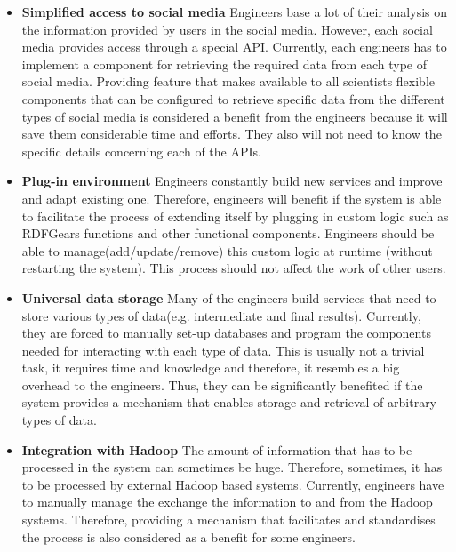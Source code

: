 \begin{itemize}

\item \textbf{Simplified access to social media}
Engineers base a lot of their analysis on the information provided by users in the social media. However, each social media provides access through a special API. Currently, each engineers has to implement a component for retrieving the required data from each type of social media. Providing feature that makes available to all scientists flexible components that can be configured to retrieve specific data from the different types of social media is considered a benefit from the engineers because it will save them considerable time and efforts. They also will not need to know the specific details concerning each of the APIs. 

\item \textbf{Plug-in environment}
Engineers constantly build new services and improve and adapt existing one. Therefore, engineers will benefit if the system is able to facilitate the process of extending itself by plugging in custom logic such as RDFGears functions and other functional components. Engineers should be able to manage(add/update/remove) this custom logic at runtime (without restarting the system). This process should not affect the work of other users.

\item \textbf{Universal data storage} 
Many of the engineers build services that need to store various types of data(e.g. intermediate and final results). Currently, they are forced to manually set-up databases and program the components needed for interacting with each type of data. This is usually not a trivial task, it requires time and knowledge and therefore, it resembles a big overhead to the engineers. Thus, they can be significantly benefited if the system provides a mechanism that enables storage and retrieval of arbitrary types of data.

 
\item \textbf{Integration with Hadoop}
The amount of information that has to be processed in the system can sometimes be huge. Therefore, sometimes, it has to be processed by external Hadoop based systems. Currently, engineers have to manually manage the exchange the information to and from the Hadoop systems. Therefore, providing a mechanism that facilitates and standardises the process is also considered as a benefit for some engineers.

\end{itemize}

